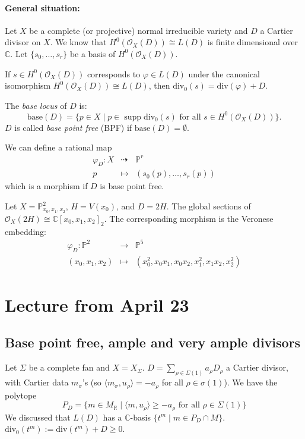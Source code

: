 \documentclass[a4paper,12pt]{amsart}
\newcommand{\RR}{\mathbb{R}}
\newcommand{\CC}{\mathbb{C}}
\newcommand{\PP}{\mathbb{P}}
\DeclareMathOperator{\supp}{supp} %
\begin{document}
\paragraph{General situation:} Let $X$ be a complete (or projective) normal irreducible variety and $D$ a Cartier divisor on $X$. We know that $H^0(\mathcal{O}_X(D)) \cong L(D)$ is finite dimensional over $\CC$. Let $\{s_0,\dots,s_r\}$ be a basis of $H^0(\mathcal{O}_X(D))$.

If $s \in H^0(\mathcal{O}_X(D))$ corresponds to $\varphi \in L(D)$ under the canonical isomorphism $H^0(\mathcal{O}_X(D)) \cong L(D)$, then $\text{div}_0(s) = \text{div}(\varphi) + D$.

\begin{definition}
The \emph{base locus} of $D$ is:
$$
\text{base}(D) = \{ p \in X \mid p \in \supp \text{div}_0(s) \text{ for all } s \in H^0(\mathcal{O}_X(D)) \}.
$$
$D$ is called \emph{base point free} (BPF) if $\text{base}(D) = \emptyset$.
\end{definition}

We can define a rational map
$$
\begin{array}{rcl}
\varphi_D : X & \dashrightarrow & \PP^r \\
p & \mapsto & (s_0(p), \dots , s_r(p))
\end{array}
$$
which is a morphism if $D$ is base point free.

\begin{example}
Let $X = \PP^2_{x_0,x_1,x_2}$, $H = V(x_0)$, and $D = 2H$. The global sections of $\mathcal{O}_X(2H) \cong \CC[x_0,x_1,x_2]_2$. The corresponding morphism is the Veronese embedding:
$$
\begin{array}{rcl}
 \varphi_D : \PP^2 & \longrightarrow & \PP^5 \\
(x_0,x_1,x_2) & \longmapsto & (x_0^2 , x_0x_1 , x_0x_2,x_1^2,x_1x_2,x_2^2)
\end{array}
$$
\end{example}
\newpage
\section{Lecture from April 23}

\subsection{Base point free, ample and very ample divisors}

Let $\Sigma$ be a complete fan and $X = X_\Sigma$. $D = \sum_{\rho \in \Sigma(1)} a_\rho D_\rho$ a Cartier divisor, with Cartier data $m_\sigma$'s (so $\langle m_\sigma , u_\rho \rangle = -a_\rho$ for all $\rho \in \sigma(1)$). We have the polytope
$$
P_D = \{ m \in M_\RR \mid \langle m , u_\rho \rangle \geq - a_\rho \text{ for all } \rho \in \Sigma(1) \}
$$
We discussed that $L(D)$ has a $\CC$-basis $\{t^m \mid m \in P_D \cap M\}$. $\text{div}_0(t^m) := \text{div}(t^m) + D \geq 0$.
\end{document}
